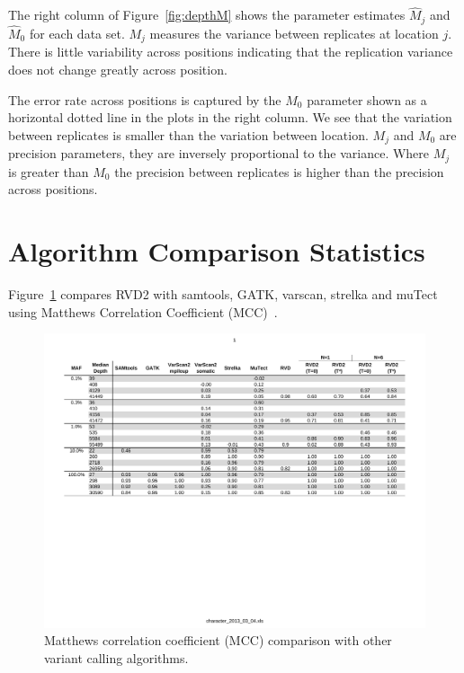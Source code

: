 \documentclass[11pt,reqno]{amsart}
\begin{document}

The right column of Figure~\ref{fig:depthM} shows the parameter estimates $\hat{M}_j$ and $\hat{M}_0$ for each data set. $M_j$ measures the variance between replicates at location $j$. There is little variability across positions indicating that the replication variance does not change greatly across position. 


The error rate across positions is captured by the $M_0$ parameter shown as a horizontal dotted line in the plots in the right column. We see that the variation between replicates is smaller than the variation between location. $M_j$ and $M_0$ are precision parameters, they are inversely proportional to the variance. Where $M_j$ is greater than $M_0$ the precision between replicates is higher than the precision across positions.

\section{Algorithm Comparison Statistics}\label{sec:app_comparison}
Figure~\ref{fig:comparison_mcc} compares RVD2 with samtools, GATK, varscan, strelka and muTect using Matthews Correlation Coefficient (MCC)~\citep{matthews1985homeostasis}.
\begin{figure}[ht]
\begin{center}
\includegraphics[width=1\textwidth]{pdf_figs/comparison_table_mcc.pdf}
\caption{Matthews correlation coefficient (MCC) comparison with other variant calling algorithms.}
\label{fig:comparison_mcc}
\end{center}
\end{figure}
\end{document}
